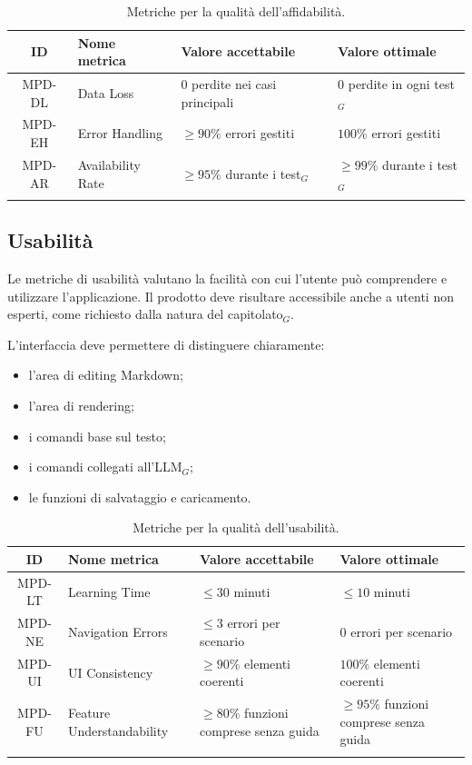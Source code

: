 \documentclass[a4paper, 10pt, colorlinks=true, linkcolor=black, urlcolor=blue, citecolor=blue, hidelinks]{article}
\begin{document}
\begingroup
\small
\renewcommand{\arraystretch}{1.25}
\begin{longtable}{|c|p{4cm}|p{3cm}|p{3cm}|}
    \hline
    \textbf{ID} & \textbf{Nome metrica} & \textbf{Valore accettabile} & \textbf{Valore ottimale} \\
    \hline
    \endhead

    MPD-DL & Data Loss & $0$ perdite nei casi principali & $0$ perdite in ogni test$_G$ \\ \hline
    MPD-EH & Error Handling & $\geq 90\%$ errori gestiti & $100\%$ errori gestiti \\ \hline
    MPD-AR & Availability Rate & $\geq 95\%$ durante i test$_G$ & $\geq 99\%$ durante i test$_G$ \\ \hline

    \caption{Metriche per la qualità dell'affidabilità.}
    \label{tab:metriche-affidabilita}
\end{longtable}
\endgroup

\subsection{Usabilità}

Le metriche di usabilità valutano la facilità con cui l'utente può comprendere e utilizzare l'applicazione. Il prodotto deve risultare accessibile anche a utenti non esperti, come richiesto dalla natura del capitolato$_G$.

L'interfaccia deve permettere di distinguere chiaramente:
\begin{itemize}
    \item l'area di editing Markdown;
    \item l'area di rendering;
    \item i comandi base sul testo;
    \item i comandi collegati all'LLM$_G$;
    \item le funzioni di salvataggio e caricamento.
\end{itemize}

\begingroup
\small
\renewcommand{\arraystretch}{1.25}
\begin{longtable}{|c|p{4cm}|p{3cm}|p{3cm}|}
    \hline
    \textbf{ID} & \textbf{Nome metrica} & \textbf{Valore accettabile} & \textbf{Valore ottimale} \\
    \hline
    \endhead

    MPD-LT & Learning Time & $\leq 30$ minuti & $\leq 10$ minuti \\ \hline
    MPD-NE & Navigation Errors & $\leq 3$ errori per scenario & $0$ errori per scenario \\ \hline
    MPD-UI & UI Consistency & $\geq 90\%$ elementi coerenti & $100\%$ elementi coerenti \\ \hline
    MPD-FU & Feature Understandability & $\geq 80\%$ funzioni comprese senza guida & $\geq 95\%$ funzioni comprese senza guida \\ \hline

    \caption{Metriche per la qualità dell'usabilità.}
    \label{tab:metriche-usabilita}
\end{longtable}
\endgroup
\end{document}
